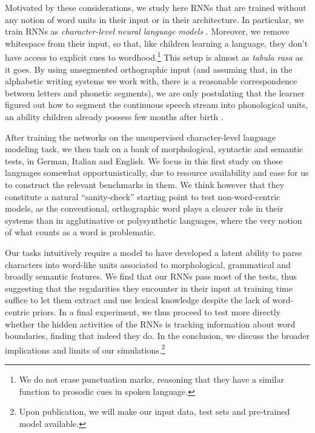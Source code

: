 Motivated by these considerations, we study here RNNs that are trained
without any notion of word units in their input or in their
architecture. In particular, we train RNNs as \emph{character-level
  neural language models}
\cite[CNLMs,][]{Mikolov:etal:2011,Sutskever:etal:2011,DBLP:journals/corr/Graves13}. Moreover,
we remove whitespace from their input, so that, like children learning
a language, they don't have access to explicit cues to
wordhood.\footnote{We do not erase punctuation marks, reasoning that
  they have a similar function to prosodic cues in spoken language.}
This setup is almost as \emph{tabula rasa} as it goes. By using
unsegmented orthographic input (and assuming that, in the alphabetic
writing systems we work with, there is a reasonable correspondence
between letters and phonetic segments), we are only postulating that
the learner figured out how to segment the continuous speech stream
into phonological units, an ability children already possess few
months after birth
\cite[e.g.,][]{Maye:etal:2002,Kuhl:2004}.

After training the networks on the unsupervised character-level
language modeling task, we then task on a bank of morphological,
syntactic and semantic tests, in German, Italian and English. We focus
in this first study on these languages somewhat opportunistically, due
to resource availability and ease for us to construct the relevant
benchmarks in them. We think however that they constitute a natural
``sanity-check'' starting point to test non-word-centric models, as
the conventional, orthographic word plays a clearer role in their
systems than in agglutinative or polysynthetic languages, where the
very notion of what counts as a word is problematic.
  
Our tasks intuitively require a model to have developed a latent
ability to parse characters into word-like units associated to
morphological, grammatical and broadly semantic features. We find that
our RNNs pass most of the tests, thus suggesting that the regularities
they encounter in their input at training time suffice to let them
extract and use lexical knowledge despite the lack of word-centric
priors. In a final experiment, we thus proceed to test more directly
whether the hidden activities of the RNNs is tracking information
about word boundaries, finding that indeed they do.  In the
conclusion, we discuss the broader implications and limits of our
simulations.\footnote{Upon publication, we will make our input data,
  test sets and pre-trained model available.}

